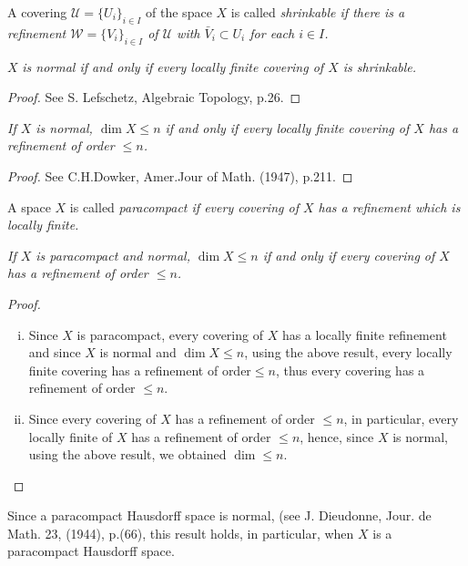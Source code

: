 \begin{defi*}
A covering $\mathscr{U}=\{ U_i \} _ {i \in I}$ of the space $X$ is
called \em{shrinkable} if there is a refinement $\mathscr{W}=\{ V_i
\} _{i \in I}$ of $\mathscr{U}$ with $\bar{V}_i \subset U_i$ for each
$i \in I$. 
\end{defi*}

$X$ \textit{is normal if and only if every locally finite covering
  of $X$ is shrinkable.} 

\begin{proof}
See S. Lefschetz, Algebraic Topology, p.26.
\end{proof}

\textit{If $X$ is normal, $\dim X \le n$ if and only if every locally
  finite covering of $X$ has a refinement of order $\le n$.} 

\begin{proof}
See C.H.Dowker, Amer.Jour of Math. (1947), p.211.
\end{proof}

\begin{defi*}
A space $X$ is called \em{paracompact} if every covering of $X$ has a
refinement which is locally finite. 
\end{defi*}

\textit{If $X$ is paracompact and normal, $\dim X \leq n$ if and only
  if every covering of $X$ has a refinement of order $\leq n$.} 

\begin{proof}
\begin{enumerate}[(i)]
\item Since $X$ is paracompact, every covering of $X$ has a locally
  finite refinement and since $X$ is normal and $\dim X \leq n$, using
  the above result, every locally finite covering has a refinement of
  order\pageoriginale $\leq n$, thus every covering has a refinement of
  order $\leq  n$. 

\item Since every covering of $X$ has a refinement of order $\leq n$,
  in particular, every locally finite of $X$ has a refinement of order
  $\leq n$, hence, since $X$ is normal, using the above result, we
  obtained $\dim \leq n$. 
\end{enumerate}
\end{proof}

\begin{remark*}
Since a paracompact Hausdorff space is normal, (see
J. Dieu\-donne, Jour. de Math. 23, (1944), p.(66), this result holds,
in particular, when $X$ is a paracompact Hausdorff space. 
\end{remark*}

